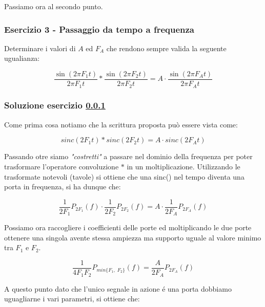 \documentclass[../main.tex]{subfiles}
\begin{document}
Passiamo ora al secondo punto.





\vspace*{1.5cm}
\subsubsection{Esercizio 3 - Passaggio da tempo a frequenza}
\label{ss23}

Determinare i valori di $A$ ed $F_A$ che rendono sempre valida la seguente ugualianza:

\begin{equation*}
	\frac{\sin(2\pi F_1 t)}{2\pi F_1 t} \ast \frac{\sin(2\pi F_2 t)}{2\pi F_2 t} = A \cdot \frac{\sin(2\pi F_A t)}{2\pi F_A t} 
\end{equation*}

\subsubsection*{Soluzione esercizio \ref{ss23}}

Come prima cosa notiamo che la scrittura proposta può essere vista come:

\begin{equation}
	\unit{sinc}(2 F_1 t) \ast \unit{sinc}(2 F_2 t) = A \cdot \unit{sinc}(2 F_A t)
\end{equation}

Passando otre siamo \textit{"costretti"} a passare nel dominio della frequenza per poter trasformare l'operatore convoluzione $\ast$ in un moltiplicazione.
Utilizzando le trasformate notevoli (tavole) si ottiene che una sinc() nel tempo diventa una porta in frequenza, si ha dunque che:

\begin{equation}
	\frac{1}{2F_1} P_{2F_1}(f) \cdot \frac{1}{2F_2} P_{2F_2}(f) = A \cdot \frac{1}{2F_A} P_{2F_A} (f)
\end{equation}

Possiamo ora raccogliere i coefficienti delle porte ed moltiplicando le due porte ottenere una singola avente stessa ampiezza ma supporto uguale al valore minimo tra $F_1$ e $F_2$.

\begin{equation}
	\frac{1}{4F_1F_2} P_{min\{ F_1, \; F_2 \}} (f)  = \frac{A}{2F_A} P_{2F_A}(f)
\end{equation}

A questo punto dato che l'unico segnale in azione é una porta dobbiamo uguagliarne i vari parametri, si ottiene che:
\end{document}
